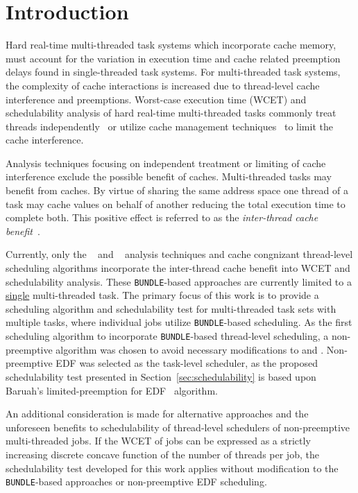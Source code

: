 \section{Introduction}

Hard real-time multi-threaded task systems which incorporate cache
memory, must account for the variation in execution time and cache
related preemption delays found in single-threaded task systems. For
multi-threaded task systems, the complexity of cache interactions is
increased due to thread-level cache interference and preemptions.
Worst-case execution time (WCET) and schedulability analysis of hard
real-time multi-threaded tasks commonly treat threads
independently~\cite{Pellizzoni:2011} or utilize cache management
techniques~\cite{Ward:2013} to limit the cache interference. 

Analysis techniques focusing on independent treatment or
limiting of cache interference exclude the possible benefit of
caches. Multi-threaded tasks may benefit from caches. By virtue of
sharing the same address space one thread of a task may cache values
on behalf of another reducing the total execution time to complete
both. This positive effect is referred to as the
\emph{inter-thread cache benefit}~\cite{Tessler:2016}. 

Currently, only the \bundle{}~\cite{Tessler:2016} and
\bundlep{}~\cite{Tessler:2018} analysis techniques and cache
congnizant thread-level scheduling algorithms incorporate the
inter-thread cache benefit into WCET and schedulability
analysis. These \texttt{BUNDLE}-based approaches are currently limited
to a \underline{single} multi-threaded task. The primary focus of this
work is to provide a scheduling algorithm and schedulability test for
multi-threaded task sets with multiple tasks, where individual jobs
utilize \texttt{BUNDLE}-based scheduling. As the first scheduling
algorithm to incorporate \texttt{BUNDLE}-based thread-level
scheduling, a non-preemptive algorithm was chosen to avoid necessary
modifications to \bundle{} and \bundlep{}. Non-preemptive EDF was
selected as the task-level scheduler, as the proposed schedulability
test presented in Section~\ref{sec:schedulability} is based upon
Baruah's limited-preemption for EDF~\cite{Baruah:2005} algorithm. 

An additional consideration is made for alternative approaches and
the unforeseen benefits to schedulability of thread-level schedulers
of non-preemptive multi-threaded jobs. If the WCET of jobs can be
expressed as a strictly increasing discrete concave function of the
number of threads per job, the schedulability test developed for this
work applies without modification to the \texttt{BUNDLE}-based
approaches or non-preemptive EDF scheduling. 

